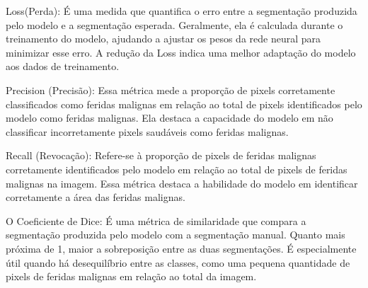 Loss(Perda): É uma medida que quantifica o erro entre a segmentação produzida pelo modelo e a segmentação esperada. Geralmente, ela é calculada durante o treinamento do modelo, ajudando a ajustar os pesos da rede neural para minimizar esse erro. A redução da Loss indica uma melhor adaptação do modelo aos dados de treinamento.

Precision (Precisão): Essa métrica mede a proporção de pixels corretamente classificados como feridas malignas em relação ao total de pixels identificados pelo modelo como feridas malignas. Ela destaca a capacidade do modelo em não classificar incorretamente pixels saudáveis como feridas malignas.

Recall (Revocação): Refere-se à proporção de pixels de feridas malignas corretamente identificados pelo modelo em relação ao total de pixels de feridas malignas na imagem. Essa métrica destaca a habilidade do modelo em identificar corretamente a área das feridas malignas.

O Coeficiente de Dice: É uma métrica de similaridade que compara a segmentação produzida pelo modelo com a segmentação manual. Quanto mais próxima de 1, maior a sobreposição entre as duas segmentações. É especialmente útil quando há desequilíbrio entre as classes, como uma pequena quantidade de pixels de feridas malignas em relação ao total da imagem.